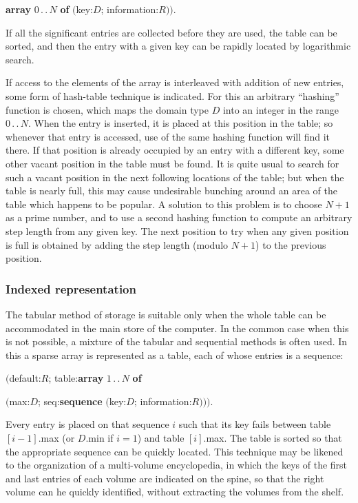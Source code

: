 \documentclass[twoside,11pt]{book}
\begin{document}
\tabto*{8em}\textbf{array} $0\,.\,.\,N$ \textbf{of} $($key:$D$; information:$R))$.

\noindent
If all the significant entries are collected before they are used, the table can be sorted, and then the entry with a given key can be rapidly located by logarithmic search.

If access to the elements of the array is interleaved with addition of new entries, some form of hash-table technique is indicated. For this an arbitrary ``hashing'' function is chosen, which maps the domain type $D$ into an integer in the range $0\,.\,.\,N$. When the entry is inserted, it is placed at this position in the table; so whenever that entry is accessed, use of the same hashing function will find it there. If that position is already occupied by an entry with a different key, some other vacant position in the table must be found. It is quite usual to search for such a vacant position in the next following locations of the table; but when the table is nearly full, this may cause undesirable bunching around an area of the table which happens to be popular. A solution to this problem is to choose $N + 1$ as a prime number, and to use a second hashing function to compute an arbitrary step length from any given key. The next position to try when any given position is full is obtained by adding the step length (modulo $N + 1$) to the previous position.

\subsubsection{Indexed representation}

The tabular method of storage is suitable only when the whole table can be
accommodated in the main store of the computer. In the common case
when this is not possible, a mixture of the tabular and sequential methods is
often used. In this a sparse array is represented as a table, each of whose
entries is a sequence:

\quad $($default:$R$; table:\textbf{array} $1\,.\,.\,N$ \textbf{of}

\tabto*{10em}$($max:$D$; seq:\textbf{sequence} $($key:$D$; information:$R)))$.

\noindent
Every entry is placed on that sequence $i$ such that its key fails between table $[i - 1]$.max (or $D$.min if $i = 1$) and table $[i]$.max. The table is sorted so that the appropriate sequence can be quickly located. This technique may be likened to the organization of a multi-volume encyclopedia, in which the keys of the first and last entries of each volume are indicated on the spine, so that the right volume can he quickly identified, without extracting the volumes from the shelf.
\end{document}
